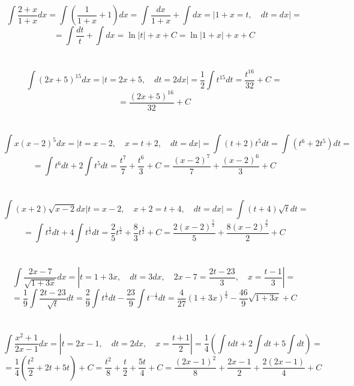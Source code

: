 \section{}
    \[\int \frac{2 + x}{1 + x}dx = \int (\frac{1}{1 + x} + 1)dx =
    \int \frac{dx}{1 + x} + \int dx = \left|1 + x = t, \quad dt = dx \right| =\]
    \[= \int \frac{dt}{t} + \int dx = \ln{|t|} + x + C = \ln{|1 + x|} + x + C\]

\section{}
    \[\int (2x + 5)^{15} dx = \left|t = 2x + 5, \quad dt = 2dx \right| =
    \frac{1}{2} \int t^{15} dt = \frac{t^{16}}{32} + C =\]
    \[= \frac{(2x + 5)^{16}}{32} + C\]    

\section{}
    \[\int x(x - 2)^5 dx = \left|t = x - 2, \quad x = t + 2, \quad dt = dx
    \right| = \int (t + 2)t^5 dt = \int (t^6 + 2t^5)dt =\]
    \[= \int t^6 dt + 2 \int t^5 dt = \frac{t^7}{7} + \frac{t^6}{3} + C =
    \frac{(x - 2)^7}{7} + \frac{(x - 2)^6}{3} + C\]
    
\section{}
    \[\int (x + 2)\sqrt{x - 2}dx \left|t = x - 2, \quad x + 2 = t + 4,
    \quad dt = dx \right| = \int (t + 4)\sqrt{t}dt =\]
    \[= \int t^{\frac{3}{2}}dt + 4 \int t^{\frac{1}{2}}dt =
    \frac{2}{5} t^{\frac{5}{2}} + \frac{8}{3} t^{\frac{3}{2}} + C =
    \frac{2(x - 2)^{\frac{5}{2}}}{5} + \frac{8(x - 2)^{\frac{3}{2}}}{2} + C\]  
    
\section{}
    \[\int \frac{2x - 7}{\sqrt{1 + 3x}}dx = \left|t = 1 + 3x, \quad dt = 3dx,
    \quad 2x - 7 = \frac{2t - 23}{3}, \quad x = \frac{t - 1}{3} \right| =\]
    \[= \frac{1}{9} \int \frac{2t - 23}{\sqrt{t}}dt =
    \frac{2}{9} \int t^{\frac{1}{2}}dt - \frac{23}{9} \int t^{-\frac{1}{2}}dt 
    = \frac{4}{27} (1 + 3x)^{\frac{3}{2}} - \frac{46}{9} \sqrt{1 + 3x} + C\]

\section{}
    \[\int \frac{x^2 + 1}{2x - 1} dx = \left|t = 2x - 1, \quad dt = 2dx,
    \quad x = \frac{t + 1}{2} \right| = \frac{1}{4} (\int tdt + 2 \int dt +
    5 \int dt) =\] 
    \[= \frac{1}{4} (\frac{t^2}{2} + 2t + 5t) + C = 
    \frac{t^2}{8} + \frac{t}{2} + \frac{5t}{4} + C =
    \frac{(2x - 1)^2}{8} + \frac{2x - 1}{2} + \frac{2(2x - 1)}{4} + C\]
    

